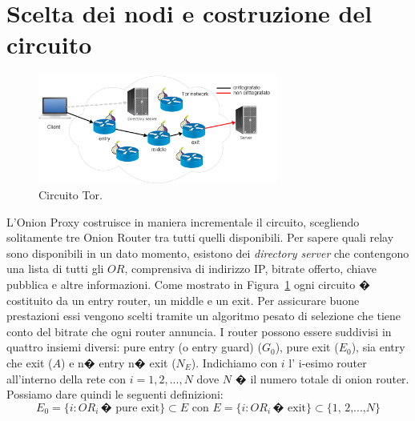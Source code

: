 \section{Scelta dei nodi e costruzione del circuito}
\begin{figure}[!htbp]
\centering
\includegraphics[width=0.7\textwidth]{./figure//tor}
\caption{Circuito Tor.}
\label{FIG:torcirc}
\end{figure}
L'Onion Proxy costruisce in maniera incrementale il circuito, scegliendo solitamente tre Onion Router tra tutti quelli disponibili. Per sapere quali relay sono disponibili in un dato momento, esistono dei \emph{directory server} che contengono una lista di tutti gli $OR$, comprensiva di indirizzo IP, bitrate offerto, chiave pubblica e altre informazioni. Come mostrato in Figura~\ref{FIG:torcirc} ogni circuito � costituito da un entry router, un middle e un exit. Per assicurare buone prestazioni essi vengono scelti tramite un algoritmo pesato di selezione che tiene conto del bitrate che ogni router annuncia.
I router possono essere suddivisi in quattro insiemi diversi: pure entry (o entry guard) ($G_{0}$), pure exit ($E_{0}$), sia entry che exit ($A$) e n� entry n� exit ($N_E$). 
Indichiamo con $i$ l' i-esimo router all'interno della rete con $i=1,2,...,N$ dove $N$ � il numero totale di onion router. Possiamo dare quindi le seguenti definizioni:
\begin{equation}
E_{0}=\{i: OR_{i} \, \text{� pure exit}\} \subset E \text{ con } E=\{i: OR_{i} \, \text{� exit}\} \subset \{\text{$1$, $2$,...,$N$}\} 
\end{equation}

